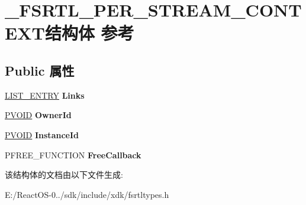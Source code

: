 \hypertarget{struct___f_s_r_t_l___p_e_r___s_t_r_e_a_m___c_o_n_t_e_x_t}{}\section{\+\_\+\+F\+S\+R\+T\+L\+\_\+\+P\+E\+R\+\_\+\+S\+T\+R\+E\+A\+M\+\_\+\+C\+O\+N\+T\+E\+X\+T结构体 参考}
\label{struct___f_s_r_t_l___p_e_r___s_t_r_e_a_m___c_o_n_t_e_x_t}
\subsection*{Public 属性}
\begin{DoxyCompactItemize}
\item 
\mbox{\label{struct___f_s_r_t_l___p_e_r___s_t_r_e_a_m___c_o_n_t_e_x_t_ad02091e3a6c3240d0299774b262e69a7}} 
\hyperlink{struct___l_i_s_t___e_n_t_r_y}{L\+I\+S\+T\+\_\+\+E\+N\+T\+RY} {\bfseries Links}
\item 
\mbox{\label{struct___f_s_r_t_l___p_e_r___s_t_r_e_a_m___c_o_n_t_e_x_t_a12a8347f7ac02b16c11a95a80f738c28}} 
\hyperlink{interfacevoid}{P\+V\+O\+ID} {\bfseries Owner\+Id}
\item 
\mbox{\label{struct___f_s_r_t_l___p_e_r___s_t_r_e_a_m___c_o_n_t_e_x_t_a6465cb0101d739986b602f863d634b8c}} 
\hyperlink{interfacevoid}{P\+V\+O\+ID} {\bfseries Instance\+Id}
\item 
\mbox{\label{struct___f_s_r_t_l___p_e_r___s_t_r_e_a_m___c_o_n_t_e_x_t_ae7b8d4cc804d07da5e0897a4afa9ddbd}} 
P\+F\+R\+E\+E\+\_\+\+F\+U\+N\+C\+T\+I\+ON {\bfseries Free\+Callback}
\end{DoxyCompactItemize}


该结构体的文档由以下文件生成\+:\begin{DoxyCompactItemize}
\item 
E\+:/\+React\+O\+S-\/0../sdk/include/xdk/fsrtltypes.\+h\end{DoxyCompactItemize}
